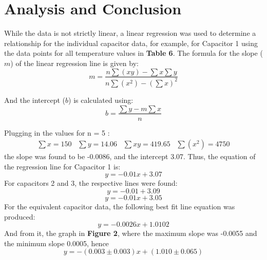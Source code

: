 \documentclass[12pt]{article}
\numberwithin{equation}{section}
\begin{document}
\FloatBarrier
\section{Analysis and Conclusion}
While the data is not strictly linear, a linear regression was used to determine a relationship for the individual capacitor data, for example, for Capacitor 1 using the data points for all temperature values in \textbf{Table 6}.
The formula for the slope ($m$) of the linear regression line is given by:
\[
m = \frac{n\sum(xy) - \sum x \sum y}{n\sum(x^2) - (\sum x)^2}
\]

And the intercept ($b$) is calculated using:
\[
b = \frac{\sum y - m\sum x}{n}
\]

Plugging in the values for n = 5 :
\begin{align*}
\sum x = 150 \hspace{10pt} \sum y = 14.06 \hspace{10pt} \sum xy = 419.65 \hspace{10pt} \sum(x^2) = 4750
\end{align*}
the slope was found to be -0.0086, and the intercept 3.07. Thus, the equation of the regression line for Capacitor 1 is:
\[
y = -0.01x + 3.07
\]
For capacitors 2 and 3, the respective lines were found:
\begin{equation}
    y = -0.01 + 3.09
\end{equation}
\begin{equation}
    y = -0.01x + 3.05
\end{equation}
For the equivalent capacitor data, the following best fit line equation was produced:
\begin{equation}
    y= -0.0026x + 1.0102
\end{equation}
And from it, the graph in \textbf{Figure 2}, where the maximum slope was -0.0055 and the minimum slope 0.0005, hence
\begin{equation}
    y = -(0.003 \pm 0.003)x + (1.010 \pm 0.065)
\end{equation}
\end{document}
